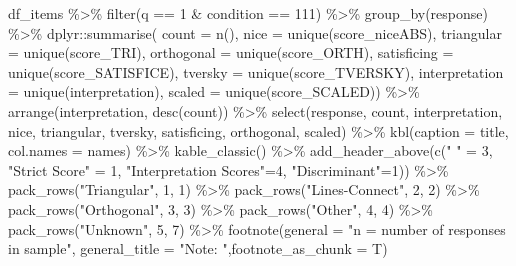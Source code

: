 \documentclass[
  letterpaper,
  DIV=11,
  numbers=noendperiod]{scrreprt}
\newenvironment{Shaded}{\begin{snugshade}}{\end{snugshade}}
\newcommand{\AttributeTok}[1]{\textcolor[rgb]{0.40,0.45,0.13}{#1}}
\newcommand{\DecValTok}[1]{\textcolor[rgb]{0.68,0.00,0.00}{#1}}
\newcommand{\FunctionTok}[1]{\textcolor[rgb]{0.28,0.35,0.67}{#1}}
\newcommand{\NormalTok}[1]{\textcolor[rgb]{0.00,0.23,0.31}{#1}}
\newcommand{\OtherTok}[1]{\textcolor[rgb]{0.00,0.23,0.31}{#1}}
\newcommand{\SpecialCharTok}[1]{\textcolor[rgb]{0.37,0.37,0.37}{#1}}
\newcommand{\StringTok}[1]{\textcolor[rgb]{0.13,0.47,0.30}{#1}}
\begin{document}
\begin{Shaded}
\begin{Highlighting}[]
\NormalTok{df\_items }\SpecialCharTok{\%\textgreater{}\%} \FunctionTok{filter}\NormalTok{(q }\SpecialCharTok{==} \DecValTok{1} \SpecialCharTok{\&}\NormalTok{ condition }\SpecialCharTok{==} \DecValTok{111}\NormalTok{) }\SpecialCharTok{\%\textgreater{}\%} \FunctionTok{group\_by}\NormalTok{(response) }\SpecialCharTok{\%\textgreater{}\%} 
\NormalTok{  dplyr}\SpecialCharTok{::}\FunctionTok{summarise}\NormalTok{( }\AttributeTok{count =} \FunctionTok{n}\NormalTok{(), }
                    \AttributeTok{nice =} \FunctionTok{unique}\NormalTok{(score\_niceABS),}
                    \AttributeTok{triangular =} \FunctionTok{unique}\NormalTok{(score\_TRI), }
                    \AttributeTok{orthogonal =}  \FunctionTok{unique}\NormalTok{(score\_ORTH),}
                    \AttributeTok{satisficing =}  \FunctionTok{unique}\NormalTok{(score\_SATISFICE),}
                    \AttributeTok{tversky =} \FunctionTok{unique}\NormalTok{(score\_TVERSKY),}
                    \AttributeTok{interpretation =} \FunctionTok{unique}\NormalTok{(interpretation),}
                    \AttributeTok{scaled =} \FunctionTok{unique}\NormalTok{(score\_SCALED)) }\SpecialCharTok{\%\textgreater{}\%} 
  \FunctionTok{arrange}\NormalTok{(interpretation, }\FunctionTok{desc}\NormalTok{(count)) }\SpecialCharTok{\%\textgreater{}\%} 
  \FunctionTok{select}\NormalTok{(response, count, interpretation, nice, }
\NormalTok{         triangular, tversky, satisficing, orthogonal, scaled) }\SpecialCharTok{\%\textgreater{}\%} 
  \FunctionTok{kbl}\NormalTok{(}\AttributeTok{caption =}\NormalTok{ title, }\AttributeTok{col.names =}\NormalTok{ names) }\SpecialCharTok{\%\textgreater{}\%}  \FunctionTok{kable\_classic}\NormalTok{() }\SpecialCharTok{\%\textgreater{}\%} 
  \FunctionTok{add\_header\_above}\NormalTok{(}\FunctionTok{c}\NormalTok{(}\StringTok{" "} \OtherTok{=} \DecValTok{3}\NormalTok{, }\StringTok{"Strict Score"} \OtherTok{=} \DecValTok{1}\NormalTok{, }\StringTok{"Interpretation Scores"}\OtherTok{=}\DecValTok{4}\NormalTok{, }\StringTok{"Discriminant"}\OtherTok{=}\DecValTok{1}\NormalTok{)) }\SpecialCharTok{\%\textgreater{}\%}
  \FunctionTok{pack\_rows}\NormalTok{(}\StringTok{"Triangular"}\NormalTok{, }\DecValTok{1}\NormalTok{, }\DecValTok{1}\NormalTok{) }\SpecialCharTok{\%\textgreater{}\%} 
  \FunctionTok{pack\_rows}\NormalTok{(}\StringTok{"Lines{-}Connect"}\NormalTok{, }\DecValTok{2}\NormalTok{, }\DecValTok{2}\NormalTok{) }\SpecialCharTok{\%\textgreater{}\%} 
  \FunctionTok{pack\_rows}\NormalTok{(}\StringTok{"Orthogonal"}\NormalTok{, }\DecValTok{3}\NormalTok{, }\DecValTok{3}\NormalTok{) }\SpecialCharTok{\%\textgreater{}\%} 
  \FunctionTok{pack\_rows}\NormalTok{(}\StringTok{"Other"}\NormalTok{, }\DecValTok{4}\NormalTok{, }\DecValTok{4}\NormalTok{)  }\SpecialCharTok{\%\textgreater{}\%} 
  \FunctionTok{pack\_rows}\NormalTok{(}\StringTok{"Unknown"}\NormalTok{, }\DecValTok{5}\NormalTok{, }\DecValTok{7}\NormalTok{)  }\SpecialCharTok{\%\textgreater{}\%} 
  \FunctionTok{footnote}\NormalTok{(}\AttributeTok{general =} \StringTok{"n = number of responses in sample"}\NormalTok{, }
           \AttributeTok{general\_title =} \StringTok{"Note: "}\NormalTok{,}\AttributeTok{footnote\_as\_chunk =}\NormalTok{ T) }
\end{Highlighting}
\end{Shaded}
\end{document}

